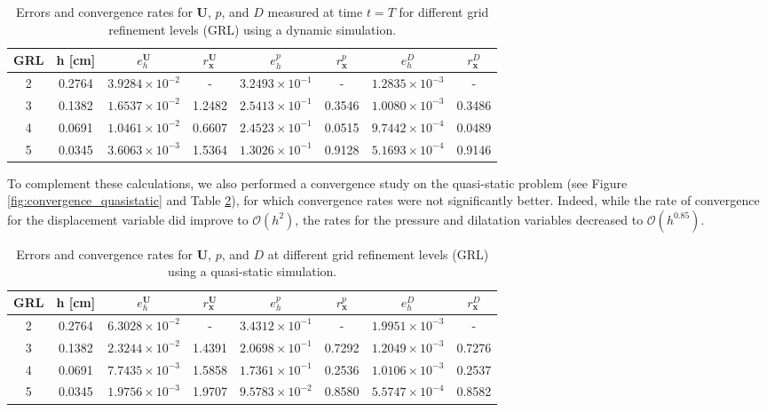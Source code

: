 \documentclass{sfuthesis}
\numberwithin{equation}{section}
\numberwithin{figure}{chapter}
\numberwithin{table}{chapter}
\theoremstyle{definition}
\def\*#1{{\mathbf{#1}}} %
\begin{document}
\begin{table}
\centering
\small
\begin{tabular}{cccccccc}
\hline
GRL & h [cm] & $e_h^{\*U}$ & $r_{\*x}^\*U$ & $e_h^{p}$ & $r_{\*x}^p$  & $e_h^{D}$ & $r_{\*x}^D$  \\
\hline
2 & 0.2764 & $3.9284 \times 10^{-2}$ & -      & $3.2493 \times 10^{-1}$ & -        & $1.2835 \times 10^{-3}$ & - \\
3 & 0.1382 & $1.6537 \times 10^{-2}$ & 1.2482 & $2.5413 \times 10^{-1}$ & 0.3546   & $1.0080 \times 10^{-3}$ & 0.3486 \\
4 & 0.0691 & $1.0461 \times 10^{-2}$ & 0.6607 & $2.4523 \times 10^{-1}$ & 0.0515   & $9.7442 \times 10^{-4}$ & 0.0489 \\
5 & 0.0345 & $3.6063 \times 10^{-3}$ & 1.5364 & $1.3026 \times 10^{-1}$ & 0.9128   & $5.1693 \times 10^{-4}$ & 0.9146 \\
\hline
\end{tabular}
\caption{Errors and convergence rates for $\*U$, $p$, and $D$ measured at time $t=T$ for different grid refinement levels (GRL) using a dynamic simulation.\label{tab:errors_rates_space}}
\end{table}



To complement these calculations, we also performed a convergence study on the quasi-static problem (see Figure \ref{fig:convergence_quasistatic} and Table \ref{tab:errors_rates_space_qs}), for which convergence rates were not significantly better. Indeed, while the rate of convergence for the displacement variable did improve to $\mathcal{O}(h^2)$, the rates for the pressure and dilatation variables decreased to $\mathcal{O}(h^{0.85})$.

\begin{table}
\centering
\small
\begin{tabular}{cccccccc}
\hline
GRL & h [cm] & $e_h^{\*U}$ & $r_{\*x}^\*U$ & $e_h^{p}$ & $r_{\*x}^p$  & $e_h^{D}$ & $r_{\*x}^D$  \\
\hline
2 & 0.2764 & $6.3028 \times 10^{-2}$ & -      & $3.4312 \times 10^{-1}$ & -        & $1.9951 \times 10^{-3}$ & - \\
3 & 0.1382 & $2.3244 \times 10^{-2}$ & 1.4391 & $2.0698 \times 10^{-1}$ & 0.7292   & $1.2049 \times 10^{-3}$ & 0.7276 \\
4 & 0.0691 & $7.7435 \times 10^{-3}$ & 1.5858 & $1.7361 \times 10^{-1}$ & 0.2536   & $1.0106 \times 10^{-3}$ & 0.2537 \\
5 & 0.0345 & $1.9756 \times 10^{-3}$ & 1.9707 & $9.5783 \times 10^{-2}$ & 0.8580   & $5.5747 \times 10^{-4}$ & 0.8582 \\
\hline
\end{tabular}
\caption{Errors and convergence rates for $\*U$, $p$, and $D$ at different grid refinement levels (GRL) using a quasi-static simulation.\label{tab:errors_rates_space_qs}}
\end{table}
\end{document}

